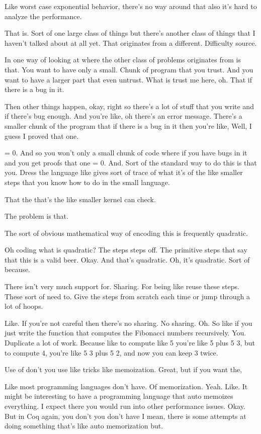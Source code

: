 \begin{subappendices}
    Like worst case exponential behavior, there's no way around that also it's hard to analyze the performance. 
    
    That is. Sort of one large class of things but there's another class of things that I haven't talked about at all yet. That originates from a different. Difficulty source. 
    
    In one way of looking at where the other class of problems originates from is that. You want to have only a small. Chunk of program that you trust. And you want to have a larger part that even untrust. What is trust me here, oh. That if there is a bug in it. 
    
    Then other things happen, okay, right so there's a lot of stuff that you write and if there's bug enough. And you're like, oh there's an error message. There's a smaller chunk of the program that if there is a bug in it then you're like, Well, I guess I proved that one. 
    
    = 0. And so you won't only a small chunk of code where if you have bugs in it and you get proofs that one = 0. And. Sort of the standard way to do this is that you. Dress the language like gives sort of trace of what it's of the like smaller steps that you know how to do in the small language. 
    
    That the that's the like smaller kernel can check. 
    
    The problem is that. 
    
    The sort of obvious mathematical way of encoding this is frequently quadratic. 
    
    Oh coding what is quadratic? The steps steps off. The primitive steps that say that this is a valid beer. Okay. And that's quadratic. Oh, it's quadratic. Sort of because. 
    
    There isn't very much support for. Sharing. For being like reuse these steps. These sort of need to. Give the steps from scratch each time or jump through a lot of hoops. 
    
    Like. If you're not careful then there's no sharing. No sharing. Oh. So like if you just write the function that computes the Fibonacci numbers recursively. You. Duplicate a lot of work. Because like to compute like 5 you're like 5 plus 5 3, but to compute 4, you're like 5 3 plus 5 2, and now you can keep 3 twice. 
    
    Use of don't you use like tricks like memoization. Great, but if you want the, 
    
    Like most programming languages don't have. Of memorization. Yeah. Like. It might be interesting to have a programming language that auto memoizes everything. I expect there you would run into other performance issues. Okay. But in Coq again, you don't you don't have I mean, there is some attempts at doing something that's like auto memorization but. 
    

\end{subappendices}
